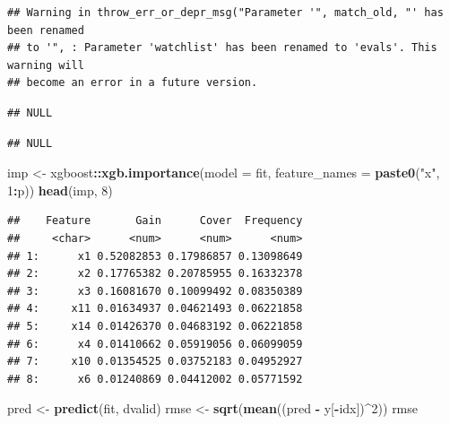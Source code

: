\documentclass[
]{book}
\newenvironment{Shaded}{\begin{snugshade}}{\end{snugshade}}
\newcommand{\AttributeTok}[1]{\textcolor[rgb]{0.13,0.29,0.53}{#1}}
\newcommand{\DecValTok}[1]{\textcolor[rgb]{0.00,0.00,0.81}{#1}}
\newcommand{\FunctionTok}[1]{\textcolor[rgb]{0.13,0.29,0.53}{\textbf{#1}}}
\newcommand{\NormalTok}[1]{#1}
\newcommand{\OtherTok}[1]{\textcolor[rgb]{0.56,0.35,0.01}{#1}}
\newcommand{\SpecialCharTok}[1]{\textcolor[rgb]{0.81,0.36,0.00}{\textbf{#1}}}
\newcommand{\StringTok}[1]{\textcolor[rgb]{0.31,0.60,0.02}{#1}}
\begin{document}
\begin{verbatim}
## Warning in throw_err_or_depr_msg("Parameter '", match_old, "' has been renamed
## to '", : Parameter 'watchlist' has been renamed to 'evals'. This warning will
## become an error in a future version.
\end{verbatim}

\begin{Shaded}
\end{Shaded}

\begin{verbatim}
## NULL
\end{verbatim}

\begin{Shaded}
\end{Shaded}

\begin{verbatim}
## NULL
\end{verbatim}

\begin{Shaded}
\begin{Highlighting}[]
\NormalTok{imp }\OtherTok{\textless{}{-}}\NormalTok{ xgboost}\SpecialCharTok{::}\FunctionTok{xgb.importance}\NormalTok{(}\AttributeTok{model =}\NormalTok{ fit, }\AttributeTok{feature\_names =} \FunctionTok{paste0}\NormalTok{(}\StringTok{"x"}\NormalTok{, }\DecValTok{1}\SpecialCharTok{:}\NormalTok{p))}
\FunctionTok{head}\NormalTok{(imp, }\DecValTok{8}\NormalTok{)}
\end{Highlighting}
\end{Shaded}

\begin{verbatim}
##    Feature       Gain      Cover  Frequency
##     <char>      <num>      <num>      <num>
## 1:      x1 0.52082853 0.17986857 0.13098649
## 2:      x2 0.17765382 0.20785955 0.16332378
## 3:      x3 0.16081670 0.10099492 0.08350389
## 4:     x11 0.01634937 0.04621493 0.06221858
## 5:     x14 0.01426370 0.04683192 0.06221858
## 6:      x4 0.01410662 0.05919056 0.06099059
## 7:     x10 0.01354525 0.03752183 0.04952927
## 8:      x6 0.01240869 0.04412002 0.05771592
\end{verbatim}

\begin{Shaded}
\begin{Highlighting}[]
\NormalTok{pred }\OtherTok{\textless{}{-}} \FunctionTok{predict}\NormalTok{(fit, dvalid)}
\NormalTok{rmse }\OtherTok{\textless{}{-}} \FunctionTok{sqrt}\NormalTok{(}\FunctionTok{mean}\NormalTok{((pred }\SpecialCharTok{{-}}\NormalTok{ y[}\SpecialCharTok{{-}}\NormalTok{idx])}\SpecialCharTok{\^{}}\DecValTok{2}\NormalTok{))}
\NormalTok{rmse}
\end{Highlighting}
\end{Shaded}
\end{document}
